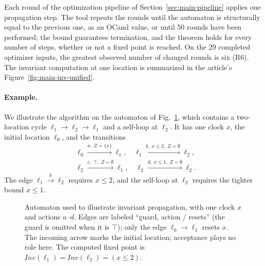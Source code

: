 Each round of the optimization pipeline of Section~\ref{sec:main-pipeline}
applies one propagation step.  The tool repeats the rounds until the
automaton is structurally equal to the previous one, as an OCaml value, or
until 50 rounds have been performed; the bound guarantees termination, and the
theorem holds for every number of steps, whether or not a fixed point is
reached. On the 29 completed optimizer inputs, the greatest observed number
of changed rounds is six (R6).
The invariant computation at one location is summarized in the article's
Figure~\ref{fig:main-inv-unified}.

\paragraph{Example.}
We illustrate the algorithm on the automaton of Fig.~\ref{fig:inv-example},
which contains a two-location cycle $\ell_1\to\ell_2\to\ell_1$ and a self-loop
at $\ell_2$.  It has one clock $x$, the initial location $\ell_0$, and the
transitions
\[
\begin{aligned}
&\ell_0 \xrightarrow{a,\;Z=\{x\}} \ell_1,\quad
 \ell_1 \xrightarrow{b,\;x\le 2,\;Z=\emptyset} \ell_2,\\
&\ell_2 \xrightarrow{c,\;\top,\;Z=\emptyset} \ell_1,\quad
 \ell_2 \xrightarrow{d,\;x\le 1,\;Z=\emptyset} \ell_2.
\end{aligned}
\]
The edge $\ell_1\xrightarrow{b}\ell_2$ requires $x\le2$, and the self-loop at
$\ell_2$ requires the tighter bound $x\le1$.

\begin{figure}[t]
\centering

\caption{Automaton used to illustrate invariant propagation, with one clock $x$
and actions $a$--$d$.  Edges are labeled ``guard, action / resets'' (the guard
is omitted when it is $\top$); only the edge $\ell_0\to\ell_1$ resets $x$.  The
incoming arrow marks the initial location; acceptance plays no role here.  The
computed fixed point is $\mathit{Inv}(\ell_1)=\mathit{Inv}(\ell_2)=(x\le2)$.}
\label{fig:inv-example}
\end{figure}

